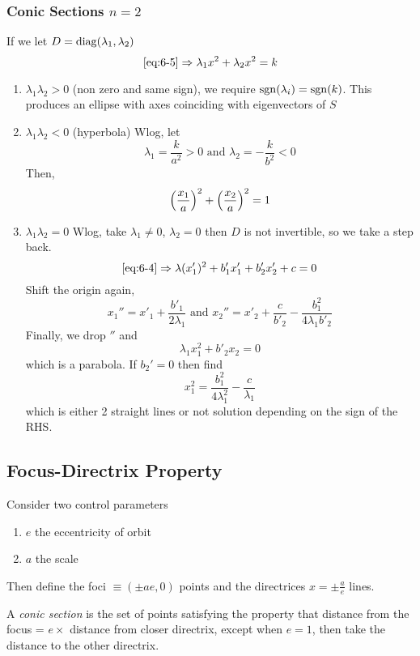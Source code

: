 \documentclass{article}
\numberwithin{equation}{section}
\begin{document}
\subsubsection*{Conic Sections $n = 2$}
If we let $D = \operatorname{diag}(\lambda_1, \lambda_2)$
\[
    \text{\eqref{eq:6-5}} \Rightarrow \lambda_1 x^2 + \lambda_2 x^2 = k    
\]
\begin{enumerate}
    \item $\lambda_1 \lambda_2 > 0$ (non zero and same sign), we require $\operatorname{sgn}(\lambda_i) = \operatorname{sgn}(k)$.
    This produces an ellipse with axes coinciding with eigenvectors of $S$

    \item $\lambda_1 \lambda_2 < 0$ (hyperbola) Wlog, let
    \[
        \lambda_1 = \frac{k}{a^2} > 0 \text{ and } \lambda_2 = -\frac{k}{b^2} < 0  
    \]
    Then,
    \[
        \left( \frac{x_1}{a} \right)^2 + \left( \frac{x_2}{a} \right)^2 = 1
    \]

    \item $\lambda_1 \lambda_2 = 0$ Wlog, take $\lambda_1 \neq 0$, $\lambda_2 = 0$ then $D$ is not invertible, so we take a step back.
    \[
        \text{\eqref{eq:6-4}} \Rightarrow \lambda(x'_1)^2 + b'_1 x'_1 + b'_2 x'_2 + c = 0
    \]
    Shift the origin again,
    \[
        x_1{''} = x'_1 + \frac{b'_1}{2 \lambda_1} \text{ and } x_2{''} = x'_2 + \frac{c}{b'_2} - \frac{b_1^2}{4 \lambda_1 b'_2}
    \]
    Finally, we drop ${''}$ and
    \[
        \lambda_1 x_1^2 + b'_2 x_2 = 0
    \]
    which is a parabola. 
    If $b_2' = 0$ then find
    \[
        x_1^2 = \frac{b_1^2}{4 \lambda_1^2} - \frac{c}{\lambda_1}  
    \]
    which is either 2 straight lines or not solution depending on the sign of the RHS.
\end{enumerate}
\subsection{Focus-Directrix Property}
Consider two control parameters
\begin{enumerate}
    \item $e$ the eccentricity of orbit
    \item $a$ the scale
\end{enumerate}
Then define the foci $\equiv (\pm ae, 0)$ points and the directrices $x = \pm \frac{a}{e}$ lines.

\begin{defi}
    A \emph{conic section} is the set of points satisfying the property that distance from the focus = $e \times$ distance from closer directrix,
    except when $e=1$, then take the distance to the other directrix.
\end{defi}
\end{document}
